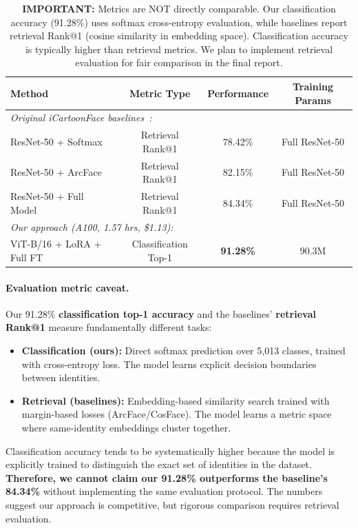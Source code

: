 \documentclass[11pt]{article}
\begin{document}
\begin{table}[H]
\centering
\small
\begin{tabular}{lccc}
\toprule
\textbf{Method} & \textbf{Metric Type} & \textbf{Performance} & \textbf{Training Params} \\
\midrule
\multicolumn{4}{l}{\textit{Original iCartoonFace baselines~\cite{zheng2020icartoonface}:}} \\
\quad ResNet-50 + Softmax & Retrieval Rank@1 & 78.42\% & Full ResNet-50 \\
\quad ResNet-50 + ArcFace & Retrieval Rank@1 & 82.15\% & Full ResNet-50 \\
\quad ResNet-50 + Full Model & Retrieval Rank@1 & 84.34\% & Full ResNet-50 \\
\midrule
\multicolumn{4}{l}{\textit{Our approach (A100, 1.57 hrs, \$1.13):}} \\
\quad ViT-B/16 + LoRA + Full FT & \cellcolor{yellow!20}Classification Top-1 & \cellcolor{yellow!20}\textbf{91.28\%} & 90.3M \\
\bottomrule
\end{tabular}
\caption{\textbf{IMPORTANT:} Metrics are NOT directly comparable. Our classification accuracy (91.28\%) uses softmax cross-entropy evaluation, while baselines report retrieval Rank@1 (cosine similarity in embedding space). Classification accuracy is typically higher than retrieval metrics. We plan to implement retrieval evaluation for fair comparison in the final report.}
\label{tab:comparison}
\end{table}

\paragraph{Evaluation metric caveat.}
Our 91.28\% \textbf{classification top-1 accuracy} and the baselines' \textbf{retrieval Rank@1} measure fundamentally different tasks:
\begin{itemize}
    \item \textbf{Classification (ours):} Direct softmax prediction over 5,013 classes, trained with cross-entropy loss. The model learns explicit decision boundaries between identities.
    \item \textbf{Retrieval (baselines):} Embedding-based similarity search trained with margin-based losses (ArcFace/CosFace). The model learns a metric space where same-identity embeddings cluster together.
\end{itemize}

Classification accuracy tends to be systematically higher because the model is explicitly trained to distinguish the exact set of identities in the dataset. \textbf{Therefore, we cannot claim our 91.28\% outperforms the baseline's 84.34\%} without implementing the same evaluation protocol. The numbers suggest our approach is competitive, but rigorous comparison requires retrieval evaluation.
\end{document}
